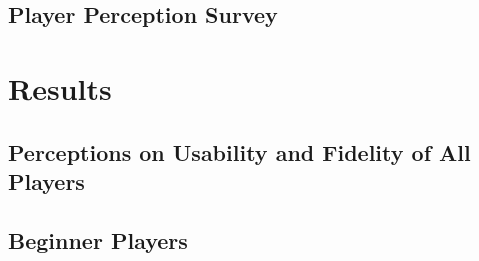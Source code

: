 \subsection{Player Perception Survey}





\section{Results}

\subsection{Perceptions on Usability and Fidelity of All Players}



\subsection{Beginner Players}



